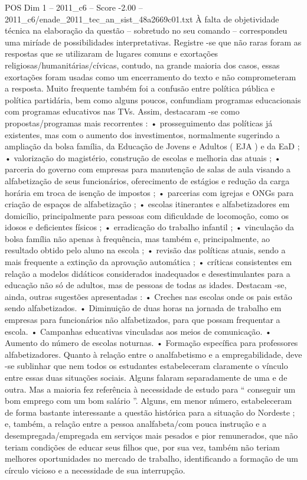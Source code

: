 \begin{textsample}{POS Dim 1 – 2011\_c6 – Score -2.00 – 2011\_c6/enade\_2011\_tec\_an\_sist\_48a2669c01.txt}
À falta de objetividade técnica na elaboração da questão – sobretudo no seu comando – correspondeu uma miríade de possibilidades interpretativas.
Registre -se que não raras foram as respostas que se utilizaram de lugares comuns e exortações religiosas/humanitárias/cívicas, contudo, na grande maioria dos casos, essas exortações foram usadas como um encerramento do texto e não comprometeram a resposta.
Muito frequente também foi a confusão entre política pública e política partidária, bem como alguns poucos, confundiam programas educacionais com programas educativos nas TVs.
Assim, destacaram -se como propostas/programas mais recorrentes : • prosseguimento das políticas já existentes, mas com o aumento dos investimentos, normalmente sugerindo a ampliação da bolsa família, da Educação de Jovens e Adultos ( EJA ) e da EaD ; • valorização do magistério, construção de escolas e melhoria das atuais ; • parceria do governo com empresas para manutenção de salas de aula visando a alfabetização de seus funcionários, oferecimento de estágios e redução da carga horária em troca de isenção de impostos ; • parcerias com igrejas e ONGs para criação de espaços de alfabetização ; • escolas itinerantes e alfabetizadores em domicílio, principalmente para pessoas com dificuldade de locomoção, como os idosos e deficientes físicos ; • erradicação do trabalho infantil ; • vinculação da bolsa família não apenas à frequência, mas também e, principalmente, ao resultado obtido pelo aluno na escola ; • revisão das políticas atuais, sendo a mais frequente a extinção da aprovação automática ; • críticas consistentes em relação a modelos didáticos considerados inadequados e desestimulantes para a educação não só de adultos, mas de pessoas de todas as idades.
Destacam -se, ainda, outras sugestões apresentadas : • Creches nas escolas onde os pais estão sendo alfabetizados. • Diminuição de duas horas na jornada de trabalho em empresas para funcionários não alfabetizados, para que possam frequentar a escola. • Campanhas educativas vinculadas aos meios de comunicação. • Aumento do número de escolas noturnas. • Formação específica para professores alfabetizadores.
Quanto à relação entre o analfabetismo e a empregabilidade, deve -se sublinhar que nem todos os estudantes estabeleceram claramente o vínculo entre essas duas situações sociais.
Alguns falaram separadamente de uma e de outra.
Mas a maioria fez referência à necessidade de estudo para “ conseguir um bom emprego com um bom salário ”.
Alguns, em menor número, estabeleceram de forma bastante interessante a questão histórica para a situação do Nordeste ; e, também, a relação entre a pessoa analfabeta/com pouca instrução e a desempregada/empregada em serviços mais pesados e pior remunerados, que não teriam condições de educar seus filhos que, por sua vez, também não teriam melhores oportunidades no mercado de trabalho, identificando a formação de um círculo vicioso e a necessidade de sua interrupção.

\end{textsample}
